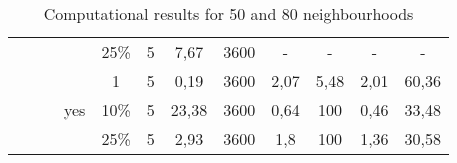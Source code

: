 \begin{table}[h!]
{\begin{tabular}{cccccccccccc}
            &       &       &       & 25\%  & 5     & 7,67  & 3600  & -     & -     & -     & - \bigstrut[b]\\
            \cline{4-12}          &       &       & \multirow{3}[2]{*}{yes} & 1     & 5     & 0,19  & 3600  & 2,07  & 5,48  & 2,01  & 60,36 \bigstrut[t]\\
            &       &       &       & 10\%  & 5     & 23,38 & 3600  & 0,64  & 100   & 0,46  & 33,48 \\
            &       &       &       & 25\%  & 5     & 2,93  & 3600  & 1,8   & 100   & 1,36  & 30,58 \bigstrut[b]\\
            \hline
    \end{tabular}}%
    \caption{Computational results for 50 and 80 neighbourhoods\label{tab:results2}}
\end{table}%